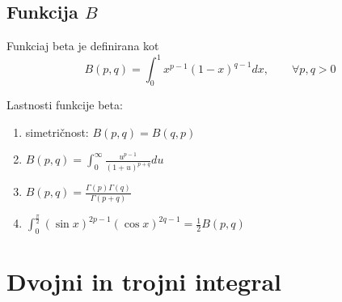 \documentclass[11pt,a4paper]{article}
\begin{document}
\subsection*{Funkcija $B$}
Funkciaj beta je definirana kot
\[B(p,q) = \int_0^1 x^{p-1} (1-x)^{q-1} dx, \qquad \forall p,q > 0\]

Lastnosti funkcije beta:
\begin{enumerate}
    \item simetričnost: $B(p,q) = B(q,p)$
    \item $\displaystyle B(p,q) = \int_0^{\infty} \frac{u^{p-1}}{(1+u)^{p+q}}du $
    \item $\displaystyle B(p,q) = \frac{\Gamma(p) \Gamma(q)}{\Gamma(p+q)}$
    \item $\displaystyle \int_0^{\frac{\pi}{2}} (\sin x)^{2p-1} (\cos x)^{2q-1} = \frac{1}{2} B(p,q)$
\end{enumerate}


\section*{Dvojni in trojni integral}
    
\end{document}
